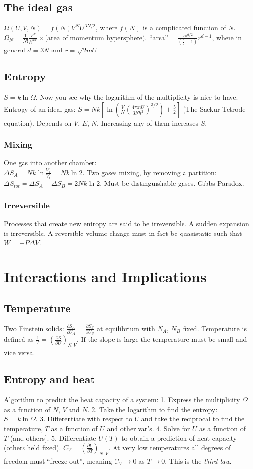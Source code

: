 \documentclass[11pt,twocolumn]{amsart}
\begin{document}
\subsection{The ideal gas}
$\Omega(U,V,N) = f(N)V^NU^{3N/2}$, where $f(N)$ is a complicated function of $N$. \\ $\Omega_N = \frac{1}{N!}\frac{V^N}{h^{3N}}\times\text{(area of momentum hypersphere)}$. $\text{``area''} = \frac{2\pi^{d/2}}{(\frac{d}{2}-1)}r^{d-1}$, where  in general $d=3N$ and $r = \sqrt{2mU}$.
\subsection{Entropy}
$S = k\ln\Omega$. Now you see why the logarithm of the multiplicity is nice to have. Entropy of an ideal gas: $S = Nk \left[\ln\left(\frac{V}{N}\left(\frac{4\pi mU}{3Nh^2}\right)^{3/2} \right) + \frac{5}{2} \right]$ (The Sackur-Tetrode equation). Depends on $V$, $E$, $N$. Increasing any of them increases $S$. 
\subsubsection{Mixing} One gas into another chamber:\\ $\Delta S_A = Nk\ln\frac{V_f}{V_i}=Nk\ln 2$. Two gases mixing, by removing a partition: $\Delta S_{tot} = \Delta S_A + \Delta S_B = 2Nk \ln 2$. Must be distinguishable gases. Gibbs Paradox.
\subsubsection{Irreversible} Processes that create new entropy are said to be irreversible. A sudden expansion is irreversible. A reversible volume change must in fact be quasistatic such that $W = - P\Delta V $.

\section{Interactions and Implications}
\subsection{Temperature}
Two Einstein solids: $\frac{\partial S_A}{\partial U_A} = \frac{\partial S_B}{\partial U_B}$ at equilibrium with $N_A$, $N_B$ fixed. Temperature is defined as $\frac{1}{T} = \left(\frac{\partial S}{\partial U} \right)_{N,V}$. If the slope is large the temperature must be small and vice versa.
\subsection{Entropy and heat}
Algorithm to predict the heat capacity of a system: 1. Express the multiplicity $\Omega$ as a function of $N$, $V$ and $N$. 2. Take the logarithm to find the entropy: $S=k\ln\Omega$. 3. Differentiate with respect to $U$ and take the reciprocal to find the temperature, $T$ as a function of $U$ and other var's. 4. Solve for $U$ as a function of $T$ (and others). 5. Differentiate $U(T)$ to obtain a prediction of heat capacity (others held fixed). $C_V = \left(\frac{\partial U}{\partial T} \right)_{N,V}$. At very low temperatures all degrees of freedom must ``freeze out'', meaning $C_V \rightarrow 0$ as $T \rightarrow 0$. This is the \emph{third law}.
\end{document}
